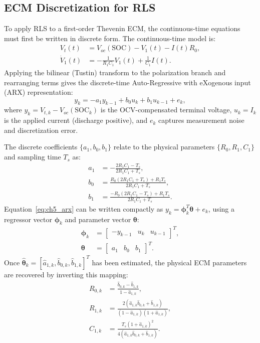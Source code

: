 \subsection{ECM Discretization for RLS}
\label{subsec:ch5_discretization}

To apply RLS to a first-order Thevenin ECM, the continuous-time equations must first be written in discrete form. The continuous-time model is:
\begin{align}
V_t(t) &= V_{oc}(\text{SOC}) - V_1(t) - I(t) R_0, \label{eq:ch5_vt_cont} \\
\dot{V}_1(t) &= -\frac{1}{R_1 C_1} V_1(t) + \frac{1}{C_1} I(t). \label{eq:ch5_v1_cont}
\end{align}
Applying the bilinear (Tustin) transform to the polarization branch and rearranging terms gives the discrete-time Auto-Regressive with eXogenous input (ARX) representation:
\begin{equation}
y_k = -a_1 y_{k-1} + b_0 u_k + b_1 u_{k-1} + e_k,
\label{eq:ch5_arx}
\end{equation}
where $y_k = V_{t,k} - V_{oc}(\text{SOC}_k)$ is the OCV-compensated terminal voltage, $u_k = I_k$ is the applied current (discharge positive), and $e_k$ captures measurement noise and discretization error.

The discrete coefficients $\{a_1, b_0, b_1\}$ relate to the physical parameters $\{R_0, R_1, C_1\}$ and sampling time $T_s$ as:
\begin{align}
a_1 &= -\frac{2 R_1 C_1 - T_s}{2 R_1 C_1 + T_s}, \\
b_0 &= \frac{R_0 (2 R_1 C_1 + T_s) + R_1 T_s}{2 R_1 C_1 + T_s}, \\
b_1 &= \frac{-R_0 (2 R_1 C_1 - T_s) + R_1 T_s}{2 R_1 C_1 + T_s}.
\end{align}
Equation~\eqref{eq:ch5_arx} can be written compactly as $y_k = \boldsymbol{\phi}_k^T \boldsymbol{\theta} + e_k$, using a regressor vector $\boldsymbol{\phi}_k$ and parameter vector $\boldsymbol{\theta}$:
\begin{align}
\boldsymbol{\phi}_k &= \begin{bmatrix} -y_{k-1} & u_k & u_{k-1} \end{bmatrix}^T, \\
\boldsymbol{\theta} &= \begin{bmatrix} a_1 & b_0 & b_1 \end{bmatrix}^T.
\end{align}
Once $\hat{\boldsymbol{\theta}}_k = [\hat{a}_{1,k}, \hat{b}_{0,k}, \hat{b}_{1,k}]^T$ has been estimated, the physical ECM parameters are recovered by inverting this mapping:
\begin{align}
R_{0,k} &= \frac{\hat{b}_{0,k} - \hat{b}_{1,k}}{1 - \hat{a}_{1,k}}, \\
R_{1,k} &= \frac{2(\hat{a}_{1,k} \hat{b}_{0,k} + \hat{b}_{1,k})}{(1 - \hat{a}_{1,k})(1 + \hat{a}_{1,k})}, \\
C_{1,k} &= \frac{T_s (1 + \hat{a}_{1,k})^2}{4(\hat{a}_{1,k} \hat{b}_{0,k} + \hat{b}_{1,k})}.
\end{align}

